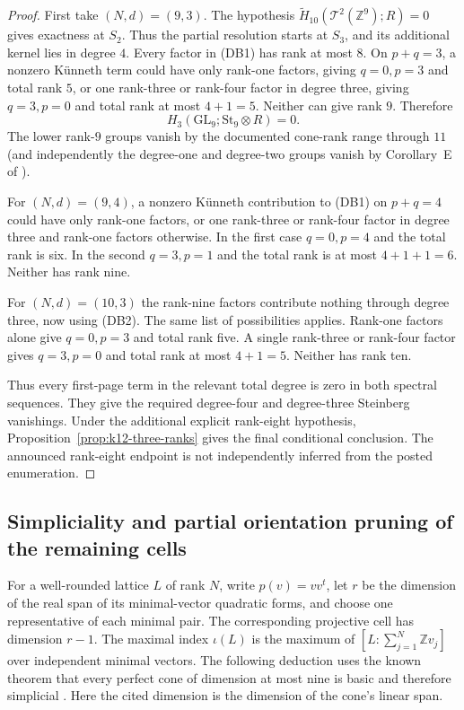 \documentclass[11pt,a4paper]{article}
\theoremstyle{definition}
\begin{document}
\begin{proof}
First take $(N,d)=(9,3)$. The hypothesis
$\widetilde H_{10}(\mathcal T^2(\mathbb Z^9);R)=0$ gives
exactness at $S_2$. Thus the partial resolution starts at $S_3$,
and its additional kernel lies in degree $4$. Every factor in
\textup{(DB1)} has rank at most $8$. On $p+q=3$, a nonzero
K\"unneth term could have only rank-one factors, giving
$q=0,p=3$ and total rank $5$, or one rank-three or rank-four
factor in degree three, giving $q=3,p=0$ and total rank at most
$4+1=5$. Neither can give rank $9$. Therefore
\[
 H_3(\mathrm{GL}_9;\mathrm{St}_9\otimes R)=0. \tag{DB2}
\]
The lower rank-$9$ groups vanish by the documented cone-rank
range through $11$ (and independently the degree-one and
degree-two groups vanish by Corollary~E of
\cite{MillerPatztPutman2025}).

For $(N,d)=(9,4)$, a nonzero K\"unneth contribution to
\textup{(DB1)} on $p+q=4$ could have only rank-one factors,
or one rank-three or rank-four factor in degree three and rank-one
factors otherwise. In the first case $q=0,p=4$ and the total rank
is six. In the second $q=3,p=1$ and the total rank is at most
$4+1+1=6$. Neither has rank nine.

For $(N,d)=(10,3)$ the rank-nine factors contribute nothing through
degree three, now using \textup{(DB2)}. The same list of possibilities applies. Rank-one
factors alone give $q=0,p=3$ and total rank five. A single
rank-three or rank-four factor gives $q=3,p=0$ and total rank at
most $4+1=5$. Neither has rank ten.

Thus every first-page term in the relevant total degree is zero in
both spectral sequences. They give the required degree-four and
degree-three Steinberg vanishings. Under the additional explicit
rank-eight hypothesis, Proposition~\ref{prop:k12-three-ranks}
gives the final conditional conclusion. The announced rank-eight
endpoint is not independently inferred from the posted enumeration.
\end{proof}


\subsection{Simpliciality and partial orientation pruning of the remaining cells}
\label{subsec:k12-orientation}

For a well-rounded lattice $L$ of rank $N$, write $p(v)=vv^t$, let
$r$ be the dimension of the real span of its minimal-vector quadratic
forms, and choose one representative of each minimal pair.
The corresponding projective cell has dimension $r-1$.
The maximal index $\iota(L)$ is the maximum of
$[L:\sum_{j=1}^N\mathbb Z v_j]$ over independent minimal vectors.
The following deduction uses the known theorem that every perfect cone
of dimension at most nine is basic and therefore simplicial
\cite[Theorem~1.1(i), pp.~644--646]{DutourHulekSchurmann2015}.
Here the cited dimension is the dimension of the cone's linear span.
\end{document}
